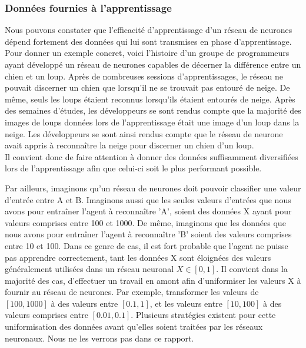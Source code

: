 \documentclass[11pt,a4paper]{report}
\begin{document}
  \subsubsection{Données fournies à l'apprentissage}
  
    \par Nous pouvons constater que l’efficacité d'apprentissage d'un réseau de neurones dépend fortement des données qui lui sont transmises en phase d’apprentissage. Pour donner un exemple concret, voici l'histoire d'un groupe de programmeurs ayant développé un réseau de neurones capables de décerner la différence entre un chien et un loup. Après de nombreuses sessions d'apprentissages, le réseau ne pouvait discerner un chien que lorsqu'il ne se trouvait pas entouré de neige. De même, seuls les loups étaient reconnus lorsqu'ils étaient entourés de neige. Après des semaines d'études, les développeurs se sont rendus compte que la majorité des images de loups données lors de l'apprentissage était une image d'un loup dans la neige. Les développeurs se sont ainsi rendus compte que le réseau de neurone avait appris à reconnaître la neige pour discerner un chien d'un loup. \\
  Il convient donc de faire attention à donner des données suffisamment diversifiées lors de l'apprentissage afin que celui-ci soit le plus performant possible. 
  
    \par Par ailleurs, imaginons qu'un réseau de neurones doit pouvoir classifier une valeur d'entrée entre A et B. Imaginons aussi que les seules valeurs d'entrées que nous avons pour entraîner l'agent à reconnaître 'A', soient des données X ayant pour valeurs comprises entre 100 et 1000. De même, imaginons que les données que nous avons pour entraîner l'agent à reconnaître 'B' soient des valeurs comprises entre 10 et 100. Dans ce genre de cas, il est fort probable que l'agent ne puisse pas apprendre correctement, tant les données X sont éloignées des valeurs généralement utilisées dans un réseau neuronal $X \in [0,1]$. Il convient dans la majorité des cas, d'effectuer un travail en amont afin d'uniformiser les valeurs X à fournir au réseau de neurones. Par exemple, transformer les valeurs de $[100,1000]$ à des valeurs entre $[0.1,1]$, et les valeurs entre $[10,100]$ à des valeurs comprises entre $[0.01, 0.1]$. Plusieurs stratégies existent pour cette uniformisation des données avant qu'elles soient traitées par les réseaux neuronaux. Nous ne les verrons pas dans ce rapport. 
  
\end{document}
